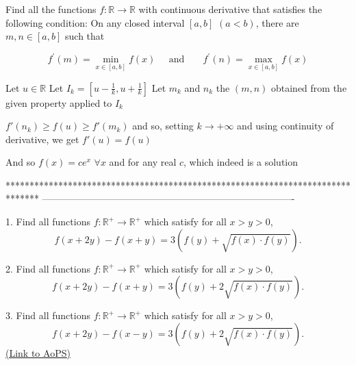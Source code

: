 \begin{solution}
	\begin{tcolorbox}Find all the functions $f:\mathbb{R}\to\mathbb{R}$ with continuous derivative that satisfies the following condition: On any closed interval $[a,b]$ $(a<b)$, there are $m,n\in[a,b]$ such that 

\[f^{\prime}(m)=\min_{x\in[a,b]}f(x)\;\;\;\;\;\mbox{and}\;\;\;\;\;\;\;f^{\prime}(n)=\max_{x\in[a,b]}f(x)\]\end{tcolorbox}
Let $u\in\mathbb R$
Let $I_k=[u-\frac 1k,u+\frac 1k]$
Let $m_k$ and $n_k$ the $(m,n)$ obtained from the given property applied to $I_k$

$f'(n_k)\ge f(u)\ge f'(m_k)$ and so, setting $k\to+\infty$ and using continuity of derivative, we get $f'(u)=f(u)$


And so $\boxed{f(x)=ce^x}$ $\forall x$ and for any real $c$, which indeed is a solution
\end{solution}
*******************************************************************************
-------------------------------------------------------------------------------

\begin{problem}
	1. Find all functions $f: \mathbb R^+ \to \mathbb R^+$ which satisfy for all $x> y> 0$,
\[f(x+2y)-f(x+y)=3\left(f(y)+\sqrt{f(x) \cdot f(y)}\right).\]

2. Find all functions $f: \mathbb R^+ \to \mathbb R^+$ which satisfy for all $x> y> 0$,
\[f(x+2y)-f(x+y)=3\left(f(y)+2\sqrt{f(x)\cdot f(y)}\right).\]

3. Find all functions $f: \mathbb R^+ \to \mathbb R^+$ which satisfy for all $x> y> 0$,
\[f(x+2y)-f(x-y)=3\left(f(y)+2\sqrt{f(x)\cdot f(y)}\right).\]
	\flushright \href{https://artofproblemsolving.com/community/c6h440093}{(Link to AoPS)}
\end{problem}



